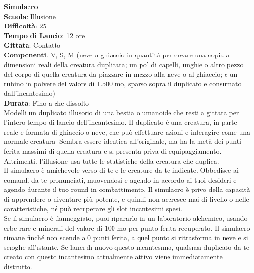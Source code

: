 \begin{multicols}{2}
\medskip\textbf{Simulacro}\\
\textbf{Scuola}: Illusione\\
\textbf{Difficoltà}: 25\\
\textbf{Tempo di Lancio}: 12 ore\\
\textbf{Gittata}: Contatto\\
\textbf{Componenti}: V, S, M (neve o ghiaccio in quantità per creare una copia a dimensioni reali della creatura duplicata; un po' di capelli, unghie o altro pezzo del corpo di quella creatura da piazzare in mezzo alla neve o al ghiaccio; e un rubino in polvere del valore di 1.500 mo, sparso sopra il duplicato e consumato dall'incantesimo)\\
\textbf{Durata}: Fino a che dissolto\\
Modelli un duplicato illusorio di una bestia o umanoide che resti a gittata per l'intero tempo di lancio dell'incantesimo. Il duplicato è una creatura, in parte reale e formata di ghiaccio o neve, che può effettuare azioni e interagire come una normale creatura. Sembra essere identica all'originale, ma ha la metà dei punti ferita massimi di quella creatura e si presenta priva di equipaggiamento. Altrimenti, l'illusione usa tutte le statistiche della creatura che duplica.\\
Il simulacro è amichevole verso di te e le creature da te indicate. Obbedisce ai comandi da te pronunciati, muovendosi e agendo in accordo ai tuoi desideri e agendo durante il tuo round in combattimento. Il simulacro è privo della capacità di apprendere o diventare più potente, e quindi non accresce mai di livello o nelle caratteristiche, né può recuperare gli slot incantesimi spesi.\\
Se il simulacro è danneggiato, puoi ripararlo in un laboratorio alchemico, usando erbe rare e minerali del valore di 100 mo per punto ferita recuperato. Il simulacro rimane finché non scende a 0 punti ferita, a quel punto si ritrasforma in neve e si scioglie all'istante. Se lanci di nuovo questo incantesimo, qualsiasi duplicato da te creato con questo incantesimo attualmente attivo viene immediatamente distrutto.


\end{multicols}
